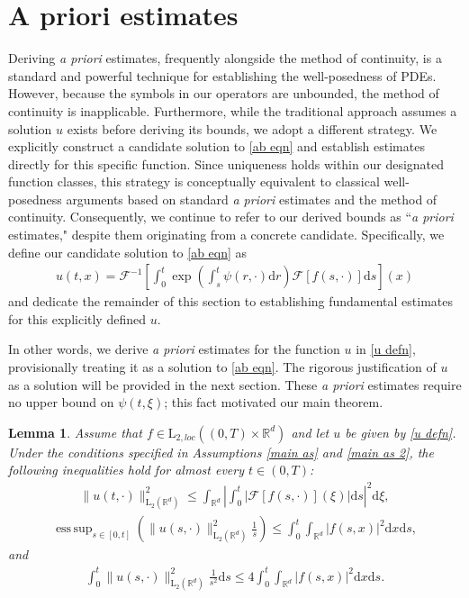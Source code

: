 \documentclass[11pt,reqno]{amsart}
\newtheorem{lem}[thm]{Lemma}
\theoremstyle{definition}
\theoremstyle{remark}
\newcommand\bR{\mathbb{R}}
\newcommand\cF{\mathcal{F}}
\DeclareMathOperator*{\esssup}{ess\,sup}
\numberwithin{equation}{section}
\newcommand{\mysection}[1]{\section{#1}}
\begin{document}
\mysection{A priori estimates}


Deriving \textit{a priori} estimates, frequently alongside the method of continuity, is a standard and powerful technique for establishing the well-posedness of PDEs. 
However, because the symbols in our operators are unbounded, the method of continuity is inapplicable. 
Furthermore, while the traditional approach assumes a solution $u$ exists before deriving its bounds, we adopt a different strategy. 
We explicitly construct a candidate solution to \eqref{ab eqn} and establish estimates directly for this specific function. 
Since uniqueness holds within our designated function classes, this strategy is conceptually equivalent to classical well-posedness arguments based on standard \textit{a priori} estimates and the method of continuity.
 Consequently, we continue to refer to our derived bounds as ``\textit{a priori} estimates," despite them originating from a concrete candidate. 
Specifically, we define our candidate solution to \eqref{ab eqn} as
\begin{align}
										\label{u defn}
u(t,x)=  \cF^{-1}\left[ \int_0^t  \exp\left(\int_s^t\psi(r,\cdot)\mathrm{d}r \right) \cF[f(s,\cdot)]\mathrm{d}s \right](x)
\end{align}
and dedicate the remainder of this section to establishing fundamental estimates for this explicitly defined $u$.

In other words, we derive \textit{a priori} estimates for the function $u$ in \eqref{u defn}, provisionally treating it as a solution to \eqref{ab eqn}. 
The rigorous justification of $u$ as a solution will be provided in the next section.
These \textit{a priori} estimates require no upper bound on $\psi(t,\xi)$; this fact motivated our main theorem.


\begin{lem}
							\label{l2 bounded lemma 1}
Assume that $f \in \mathrm{L}_{2,loc}\left( (0,T) \times \mathbb{R}^d \right)$ and let $u$ be given by \eqref{u defn}. 
Under the conditions specified in Assumptions \ref{main as} and \ref{main as 2}, 
the following inequalities hold for almost every $t \in (0,T)$:
\begin{align}
										\label{20260321 01}
\|u(t,\cdot)\|^2_{\mathrm{L}_2(\mathbb{R}^d)} 
\leq \int_{\mathbb{R}^d} \left|\int_0^t |\mathcal{F}[f(s,\cdot)](\xi)| \mathrm{d}s \right|^2 \mathrm{d}\xi,
\end{align}
\begin{align}
										\label{20260321 01-2}
\esssup_{s \in [0,t]} \left( \|u(s,\cdot)\|^2_{\mathrm{L}_2(\bR^d)} \frac{1}{s} \right)
\leq  \int_0^{t} \int_{\bR^d} |f(s,x)|^2   \mathrm{d}x\mathrm{d}s,
\end{align}
and
\begin{align}
										\label{20260321 02}
\int_0^t \|u(s,\cdot)\|^2_{\mathrm{L}_2(\bR^d)} \frac{1}{s^2} \mathrm{d}s
\leq   4\int_0^t \int_{\bR^d}  \left|f(s,x)\right|^2 \mathrm{d}x \mathrm{d}s.
\end{align}
\end{lem}
\end{document}
